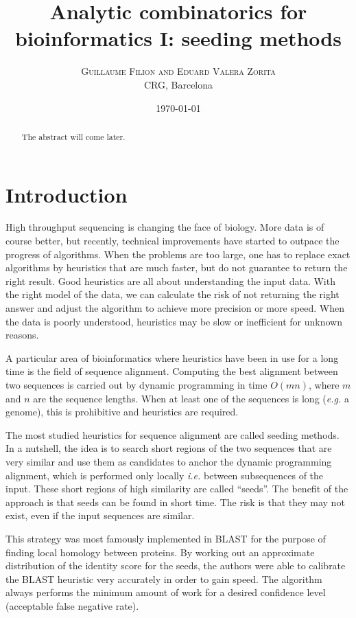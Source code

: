 \documentclass{article}
\title{Analytic combinatorics for bioinformatics I:
seeding methods}
\author{
\textsc{Guillaume Filion and Eduard Valera Zorita} \\ [1ex]
\normalsize CRG, Barcelona
}
\date{\today}
\begin{document}
\maketitle

\begin{abstract}
The abstract will come later.
\end{abstract}



\section{Introduction}

High throughput sequencing is changing the face of biology. More data is
of course better, but recently, technical improvements have started to
outpace the progress of algorithms. When the problems are too large,
one has to replace exact algorithms by heuristics that are much faster,
but do not guarantee to return the right result. Good heuristics are all
about understanding the input data. With the right model of the data, we
can calculate the risk of not returning the right answer and adjust the
algorithm to achieve more precision or more speed. When the data is poorly
understood, heuristics may be slow or inefficient for unknown reasons.

A particular area of bioinformatics where heuristics have been in use for
a long time is the field of sequence alignment. Computing the best
alignment between two sequences is carried out by dynamic programming in
time $O(mn)$, where $m$ and $n$ are the sequence lengths. When at least
one of the sequences is long (\textit{e.g.} a genome), this is prohibitive
and heuristics are required.

The most studied heuristics for sequence alignment are called seeding
methods. In a nutshell, the idea is to search short regions of the two
sequences that are very similar and use them as candidates to anchor the
dynamic programming alignment, which is performed only locally
\textit{i.e.} between subsequences of the input. These short regions of
high similarity are called ``seeds''. The benefit of the approach is that
seeds can be found in short time. The risk is that they may not exist,
even if the input sequences are similar.

This strategy was most famously implemented in BLAST for the purpose of
finding local homology between proteins. By working out an approximate
distribution of the identity score for the seeds, the authors were able to
calibrate the BLAST heuristic very accurately in order to gain speed. The
algorithm always performs the minimum amount of work for a desired
confidence level (acceptable false negative rate).
\end{document}
